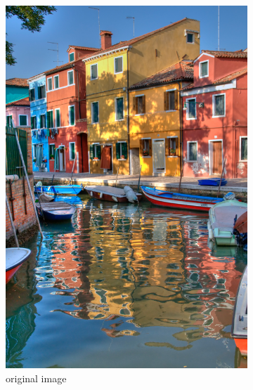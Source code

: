 \documentclass[a4paper, twocolumn, twoside]{article}
\begin{document}
\begin{figure}[h!]
    \centering
    \begin{subfigure}{.32\textwidth}
        \centering
        \includegraphics[width=\linewidth]{images/original_30.png}
        \caption{original image}
    \end{subfigure}
    \hfill
    \begin{subfigure}{.32\textwidth}
        \centering

\end{subfigure}
\end{figure}
\end{document}
